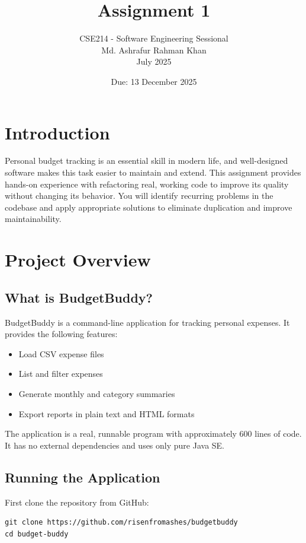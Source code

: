 \documentclass[10pt]{article}
\title{Assignment 1}
\author{CSE214 - Software Engineering Sessional\\
  Md. Ashrafur Rahman Khan\\
July 2025}
\date{Due: 13 December 2025}
\begin{document}
\maketitle

\section{Introduction}

Personal budget tracking is an essential skill in modern life, and well-designed software makes this task easier to maintain and extend. This assignment provides hands-on experience with refactoring real, working code to improve its quality without changing its behavior. You will identify recurring problems in the codebase and apply appropriate solutions to eliminate duplication and improve maintainability.

\section{Project Overview}

\subsection{What is BudgetBuddy?}

BudgetBuddy is a command-line application for tracking personal expenses. It provides the following features:

\begin{itemize}
  \item Load CSV expense files
  \item List and filter expenses
  \item Generate monthly and category summaries
  \item Export reports in plain text and HTML formats
\end{itemize}

The application is a real, runnable program with approximately 600 lines of code. It has no external dependencies and uses only pure Java SE.

\subsection{Running the Application}

First clone the repository from GitHub:
\begin{verbatim}
git clone https://github.com/risenfromashes/budgetbuddy
cd budget-buddy
\end{verbatim}
\end{document}

